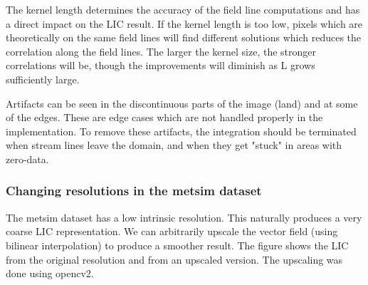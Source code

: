 \documentclass{article}
\begin{document}
\newpage 

The kernel length determines the accuracy of the field line computations and has a direct impact on the LIC result.
If the kernel length is too low, pixels which are theoretically on the same field lines will find different solutions which reduces
the correlation along the field lines. The larger the kernel size, the stronger correlations will be, though the improvements will diminish as L grows sufficiently large.

Artifacts can be seen in the discontinuous parts of the image (land) and at some of the edges. These are edge cases which are not handled properly in the implementation.
To remove these artifacts, the integration should be terminated when stream lines leave the domain, and when they get "stuck" in areas with zero-data.

\newpage 
\subsubsection{Changing resolutions in the metsim dataset}
The metsim dataset has a low intrinsic resolution. This naturally produces a very coarse LIC representation. We can arbitrarily upscale
the vector field (using bilinear interpolation) to produce a smoother result. The figure shows the LIC from the original resolution and from an upscaled version.
The upscaling was done using opencv2.
\end{document}
